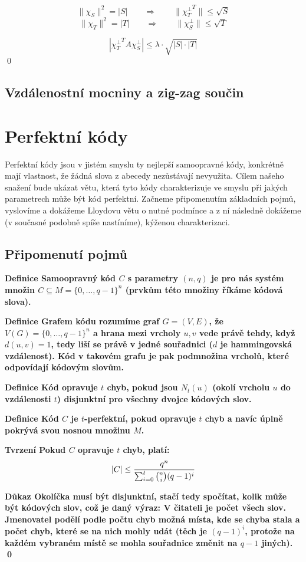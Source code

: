 \documentclass[a4paper,12pt,titlepage]{article}
\newcommand{\dk}{\smallskip\noindent\bf Důkaz\rm{} }
\newcommand{\df}{\smallskip\noindent\bf Definice\rm{} }
\newcommand{\tv}{\smallskip\noindent\bf Tvrzení\rm{} }
\newcommand{\xttt}{{\chi_T^\bot}^T}
\begin{document}
$$\|\chi_S\|^2 = |S| \qquad\Rightarrow\qquad \|\xttt\| \le \sqrt S$$
$$\|\chi_T\|^2 = |T| \qquad\Rightarrow\qquad \|\chi_S^\bot\| \le \sqrt T$$

$$|\xttt A\chi_S^\bot| \le \lambda\cdot\sqrt{|S|\cdot |T|}$$
\qed


\subsection{Vzdálenostní mocniny a zig-zag součin}

\section{Perfektní kódy}

Perfektní kódy jsou v jistém smyslu ty nejlepší samoopravné kódy, konkrétně mají vlastnost, že žádná slova z abecedy nezůstávají nevyužita. Cílem našeho snažení bude ukázat větu, která tyto kódy charakterizuje ve smyslu při jakých parametrech může být kód perfektní. Začneme připomenutím základních pojmů, vyslovíme a dokážeme Lloydovu větu o nutné podmínce a z ní následně dokážeme (v současné podobně spíše nastíníme), kýženou charakterizaci.

\subsection{Připomenutí pojmů}

\df Samoopravný kód $C$ s parametry $(n,q)$ je pro nás systém množin $C \subseteq M = \{0, \ldots, q-1\}^n$ (prvkům této množiny říkáme kódová slova).

\df Grafem kódu rozumíme graf $G=(V,E)$, že $V(G) = \{0, \ldots, q-1 \}^n$ a hrana mezi vrcholy $u,v$ vede právě tehdy, když $d(u,v) = 1$, tedy liší se právě v jedné souřadnici ($d$ je hammingovská vzdálenost). Kód v takovém grafu je pak podmnožina vrcholů, které odpovídají kódovým slovům.

\df Kód opravuje $t$ chyb, pokud jsou $N_t(u)$ (okolí vrcholu $u$ do vzdálenosti $t$) disjunktní pro všechny dvojce kódových slov.

\df Kód $C$ je $t$-perfektní, pokud opravuje $t$ chyb a navíc úplně pokrývá svou nosnou množinu $M$.

\tv Pokud $C$ opravuje $t$ chyb, platí:
\begin{align*}
	|C| \leq { q^n \over \sum_{i=0}^t \binom{n}{i} (q-1)^i }
\end{align*}

\dk Okolíčka musí být disjunktní, stačí tedy spočítat, kolik může být kódových slov, což je daný výraz: V čitateli je počet všech slov. Jmenovatel podělí podle počtu chyb možná místa, kde se chyba stala a počet chyb, které se na nich mohly udát (těch je $(q-1)^i$, protože na každém vybraném místě se mohla souřadnice změnit na $q-1$ jiných). \qed
\end{document}
